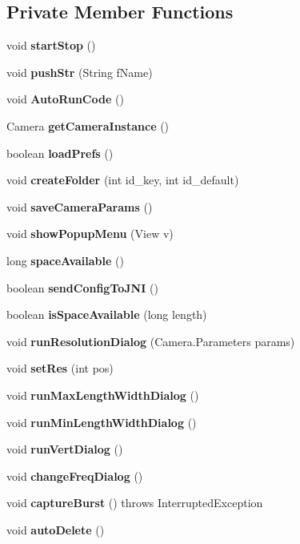 \subsection*{Private Member Functions}
\begin{DoxyCompactItemize}
\item 
void {\bf start\+Stop} ()
\item 
void {\bf push\+Str} (String f\+Name)
\item 
void {\bf Auto\+Run\+Code} ()
\item 
Camera {\bf get\+Camera\+Instance} ()
\item 
boolean {\bf load\+Prefs} ()
\item 
void {\bf create\+Folder} (int id\+\_\+key, int id\+\_\+default)
\item 
void {\bf save\+Camera\+Params} ()
\item 
void {\bf show\+Popup\+Menu} (View v)
\item 
long {\bf space\+Available} ()
\item 
boolean {\bf send\+Config\+To\+J\+N\+I} ()
\item 
boolean {\bf is\+Space\+Available} (long length)
\item 
void {\bf run\+Resolution\+Dialog} (Camera.\+Parameters params)
\item 
void {\bf set\+Res} (int pos)
\item 
void {\bf run\+Max\+Length\+Width\+Dialog} ()
\item 
void {\bf run\+Min\+Length\+Width\+Dialog} ()
\item 
void {\bf run\+Vert\+Dialog} ()
\item 
void {\bf change\+Freq\+Dialog} ()
\item 
void {\bf capture\+Burst} ()  throws Interrupted\+Exception 	
\item 
void {\bf auto\+Delete} ()
\end{DoxyCompactItemize}
